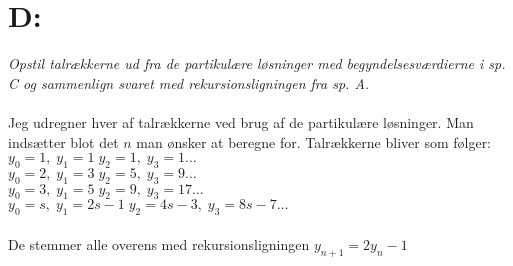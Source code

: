 \documentclass[a4paper, 11pt]{article}
\begin{document}
\section*{D:}
\textit{Opstil talrækkerne ud fra de partikulære løsninger med begyndelsesværdierne i sp. C og sammenlign svaret med rekursionsligningen fra sp. A.}\\\\
Jeg udregner hver af talrækkerne ved brug af de partikulære løsninger. Man indsætter blot det \(n\) man ønsker at beregne for.
Talrækkerne bliver som følger:\\
\(y_0=1,\; y_1=1\; y_2=1,\; y_3=1 \dots\)\\
\(y_0=2,\; y_1=3\; y_2=5,\; y_3=9 \dots\)\\
\(y_0=3,\; y_1=5\; y_2=9,\; y_3=17 \dots\)\\
\(y_0=s,\; y_1=2s-1\; y_2=4s-3,\; y_3=8s-7 \dots\)\\\\
De stemmer alle overens med rekursionsligningen \(y_{n+1}=2y_n-1\)
\end{document}

